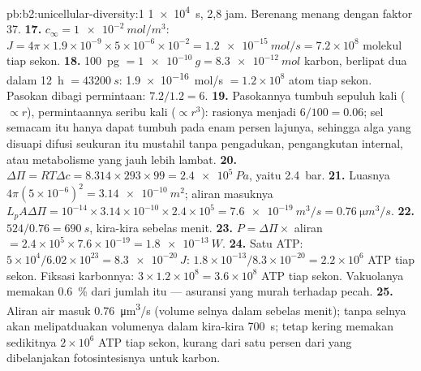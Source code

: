 \begin{solution}{pb:b2:unicellular-diversity:1}
\qty{1e4}{s}, 2,8 jam. Berenang menang dengan faktor 37.
\textbf{17.} $c_\infty = \qty{1e-2}{mol/m^3}$: $J = 4\pi\times
1.9\times 10^{-9}\times 5\times 10^{-6}\times 10^{-2} =
\qty{1.2e-15}{mol/s} = 7.2\times 10^8$ molekul tiap sekon.
\textbf{18.} \qty{100}{pg} $= \qty{1e-10}{g} = \qty{8.3e-12}{mol}$
karbon, berlipat dua dalam \qty{12}{h} $= \qty{43200}{s}$:
\qty{1.9e-16}{mol/s} $= 1.2\times 10^8$ atom tiap sekon. Pasokan
dibagi permintaan: $7.2/1.2 = 6$.
\textbf{19.} Pasokannya tumbuh sepuluh kali ($\propto r$),
permintaannya seribu kali ($\propto r^3$): rasionya menjadi
$6/100 = 0.06$; sel semacam itu hanya dapat tumbuh pada enam persen
lajunya, sehingga alga yang disuapi difusi seukuran itu mustahil
tanpa pengadukan, pengangkutan internal, atau metabolisme yang jauh
lebih lambat.
\textbf{20.} $\Delta\Pi = RT\Delta c = 8.314\times 293\times 99 =
\qty{2.4e5}{Pa}$, yaitu \qty{2.4}{bar}.
\textbf{21.} Luasnya $4\pi(5\times 10^{-6})^2 = \qty{3.14e-10}{m^2}$;
aliran masuknya $L_p A\Delta\Pi = 10^{-14}\times 3.14\times 10^{-10}\times
2.4\times 10^5 = \qty{7.6e-19}{m^3/s} = \qty{0.76}{\micro m^3/s}$.
\textbf{22.} $524/0.76 = \qty{690}{s}$, kira-kira sebelas menit.
\textbf{23.} $P = \Delta\Pi\times$ aliran $= 2.4\times 10^5\times
7.6\times 10^{-19} = \qty{1.8e-13}{W}$.
\textbf{24.} Satu ATP: $5\times 10^4/6.02\times 10^{23} =
\qty{8.3e-20}{J}$: $1.8\times 10^{-13}/8.3\times 10^{-20} = 2.2\times
10^6$ ATP tiap sekon. Fiksasi karbonnya: $3\times 1.2\times 10^8 =
3.6\times 10^8$ ATP tiap sekon. Vakuolanya memakan \qty{0.6}{\%} dari
jumlah itu --- asuransi yang murah terhadap pecah.
\textbf{25.} Aliran air masuk \qty{0.76}{\micro m^3/s} (volume selnya
dalam sebelas menit); tanpa  selnya akan
melipatduakan volumenya dalam kira-kira \qty{700}{s}; tetap kering
memakan sedikitnya $2\times 10^6$ ATP tiap sekon, kurang dari satu
persen dari yang dibelanjakan fotosintesisnya untuk karbon.
\end{solution}
